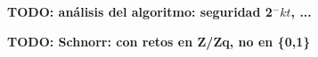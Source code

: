 

\textbf{TODO: análisis del algoritmo: seguridad 2$^-kt$, ...}




\textbf{TODO: Schnorr: con retos en Z/Zq, no en \{0,1\}}


%
%
%
%
%






